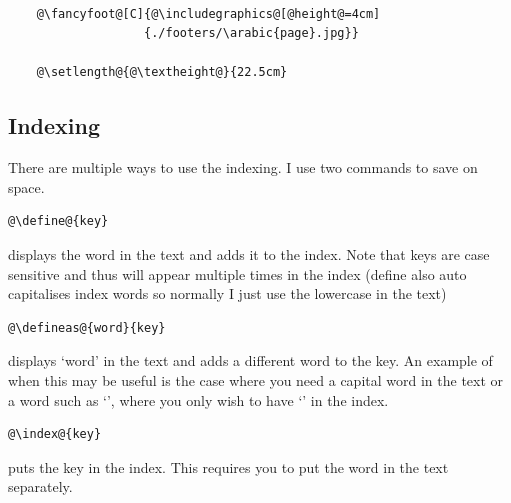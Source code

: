     \vspace{1cm}

    \begin{lstlisting}[style=base]

    @\fancyfoot@[C]{@\includegraphics@[@height@=4cm]
                   {./footers/\arabic{page}.jpg}}

    @\setlength@{@\textheight@}{22.5cm}

    \end{lstlisting}

\subsection{Indexing}
    \label{ch1_section_using_indexing}
    
    There are multiple ways to use the indexing. I use two commands to save on space.

    \begin{lstlisting}[style=base]
    @\define@{key}
    \end{lstlisting}

    displays the word in the text and adds it to the index. Note that keys are case sensitive and thus will appear multiple times in the index (define also auto capitalises index words so normally I just use the lowercase in the text)

    \begin{lstlisting}[style=base]
    @\defineas@{word}{key}
    \end{lstlisting}

    displays `word' in the text and adds a different word to the key. An example of when this may be useful is the case where you need a capital word in the text or a word such as `', where you only wish to have `' in the index.

    \begin{lstlisting}[style=base]
    @\index@{key}
    \end{lstlisting}

    puts the key in the index. This requires you to put the word in the text separately.

